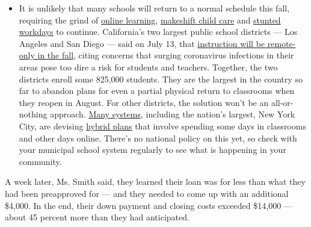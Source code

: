\begin{itemize}
  \begin{itemize}
  \tightlist
  \item
    It is unlikely that many schools will return to a normal schedule
    this fall, requiring the grind of
    \href{https://www.nytimes.com/2020/06/05/us/coronavirus-education-lost-learning.html?action=click\&pgtype=Article\&state=default\&region=MAIN_CONTENT_3\&context=storylines_faq}{online
    learning},
    \href{https://www.nytimes.com/2020/05/29/us/coronavirus-child-care-centers.html?action=click\&pgtype=Article\&state=default\&region=MAIN_CONTENT_3\&context=storylines_faq}{makeshift
    child care} and
    \href{https://www.nytimes.com/2020/06/03/business/economy/coronavirus-working-women.html?action=click\&pgtype=Article\&state=default\&region=MAIN_CONTENT_3\&context=storylines_faq}{stunted
    workdays} to continue. California's two largest public school
    districts --- Los Angeles and San Diego --- said on July 13, that
    \href{https://www.nytimes.com/2020/07/13/us/lausd-san-diego-school-reopening.html?action=click\&pgtype=Article\&state=default\&region=MAIN_CONTENT_3\&context=storylines_faq}{instruction
    will be remote-only in the fall}, citing concerns that surging
    coronavirus infections in their areas pose too dire a risk for
    students and teachers. Together, the two districts enroll some
    825,000 students. They are the largest in the country so far to
    abandon plans for even a partial physical return to classrooms when
    they reopen in August. For other districts, the solution won't be an
    all-or-nothing approach.
    \href{https://bioethics.jhu.edu/research-and-outreach/projects/eschool-initiative/school-policy-tracker/}{Many
    systems}, including the nation's largest, New York City, are
    devising
    \href{https://www.nytimes.com/2020/06/26/us/coronavirus-schools-reopen-fall.html?action=click\&pgtype=Article\&state=default\&region=MAIN_CONTENT_3\&context=storylines_faq}{hybrid
    plans} that involve spending some days in classrooms and other days
    online. There's no national policy on this yet, so check with your
    municipal school system regularly to see what is happening in your
    community.
  \end{itemize}
\end{itemize}

A week later, Ms. Smith said, they learned their loan was for less than
what they had been preapproved for --- and they needed to come up with
an additional \$4,000. In the end, their down payment and closing costs
exceeded \$14,000 --- about 45 percent more than they had anticipated.

